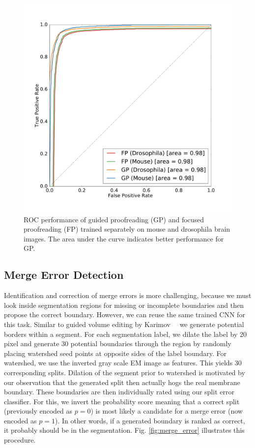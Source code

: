 \begin{figure}[h]
  \vspace{-5mm}
\begin{center}
  \includegraphics[width=\linewidth]{gfx/roc.pdf}
\end{center}
  \vspace{-10mm}
   \caption{ROC performance of guided proofreading (GP) and focused proofreading (FP) trained separately on mouse and drosophila brain images. The area under the curve indicates better performance for GP.}
\label{fig:roc}
\end{figure}
 

\subsection{Merge Error Detection}

Identification and correction of merge errors is more challenging, because we must look inside segmentation regions for missing or incomplete boundaries and then propose the correct boundary. However, we can reuse the same trained CNN for this task. Similar to guided volume editing by Karimov~\etal~\cite{karimov_guided_volume_editing} we generate potential borders within a segment. For each segmentation label, we dilate the label by 20 pixel and generate 30 potential boundaries through the region by randomly placing watershed seed points at opposite sides of the label boundary. For watershed, we use the inverted gray scale EM image as features. This yields 30 corresponding splits. Dilation of the segment prior to watershed is motivated by our observation that the generated split then actually hogs the real membrane boundary. These boundaries are then individually rated using our split error classifier. For this, we invert the probability score meaning that a correct split (previously encoded as $p=0$) is most likely a candidate for a merge error (now encoded as $p=1$). In other words, if a generated boundary is ranked as correct, it probably should be in the segmentation. Fig. \ref{fig:merge_error} illustrates this procedure.


